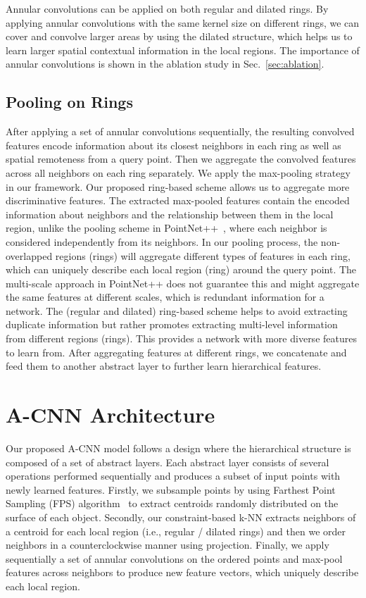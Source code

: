 \documentclass[10pt,twocolumn,letterpaper]{article}
\begin{document}
Annular convolutions can be applied on both regular and dilated rings. By applying annular convolutions with the same kernel size on different rings, we can cover and convolve larger areas by using the dilated structure, which helps us to learn larger spatial contextual information in the local regions. The importance of annular convolutions is shown in the ablation study in Sec.~\ref{sec:ablation}.
\vspace{-2mm}
\subsection{Pooling on Rings}\vspace{-1mm}
After applying a set of annular convolutions sequentially, the resulting convolved features encode information about its closest neighbors in each ring as well as spatial remoteness from a query point. Then we aggregate the convolved features across all neighbors on each ring separately. We apply the max-pooling strategy in our framework. Our proposed ring-based scheme allows us to aggregate more discriminative features. The extracted max-pooled features contain the encoded information about neighbors and the relationship between them in the local region, unlike the pooling scheme in PointNet++~\cite{qi2017pointnet++}, where each neighbor is considered independently from its neighbors. In our pooling process, the non-overlapped regions (rings) will aggregate different types of features in each ring, which can uniquely describe each local region (ring) around the query point. The multi-scale approach in PointNet++ does not guarantee this and might aggregate the same features at different scales, which is redundant information for a network. The (regular and dilated) ring-based scheme helps to avoid extracting duplicate information but rather promotes extracting multi-level information from different regions (rings). This provides a network with more diverse features to learn from. After aggregating features at different rings, we concatenate and feed them to another abstract layer to further learn hierarchical features.
\vspace{-1mm}
\section{A-CNN Architecture}\vspace{-1mm}
Our proposed A-CNN model follows a design where the hierarchical structure is composed of a set of abstract layers. Each abstract layer consists of several operations performed sequentially and produces a subset of input points with newly learned features. Firstly, we subsample points by using Farthest Point Sampling (FPS) algorithm~\cite{moenning2003fast} to extract centroids randomly distributed on the surface of each object. Secondly, our constraint-based k-NN extracts neighbors of a centroid for each local region (i.e., regular / dilated rings) and then we order neighbors in a counterclockwise manner using projection. Finally, we apply sequentially a set of annular convolutions on the ordered points and max-pool features across neighbors to produce new feature vectors, which uniquely describe each local region.
\end{document}
